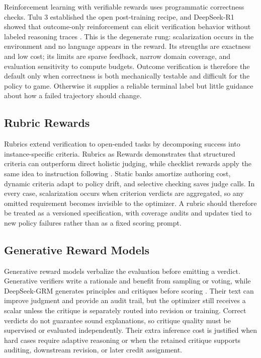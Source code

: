 Reinforcement learning with verifiable rewards uses programmatic correctness checks. Tulu 3 established the open post-training recipe, and DeepSeek-R1 showed that outcome-only reinforcement can elicit verification behavior without labeled reasoning traces \citep{lambert2024tulu,guo2025deepseek}. This is the degenerate rung: scalarization occurs in the environment and no language appears in the reward. Its strengths are exactness and low cost; its limits are sparse feedback, narrow domain coverage, and evaluation sensitivity to compute budgets.
Outcome verification is therefore the default only when correctness is both mechanically testable and difficult for the policy to game. Otherwise it supplies a reliable terminal label but little guidance about how a failed trajectory should change.

\subsection{Rubric Rewards}
\label{subsec:rubrics}

Rubrics extend verification to open-ended tasks by decomposing success into instance-specific criteria. Rubrics as Rewards demonstrates that structured criteria can outperform direct holistic judging, while checklist rewards apply the same idea to instruction following \citep{gunjal2025rubrics,viswanathan2025checklists}. Static banks amortize authoring cost, dynamic criteria adapt to policy drift, and selective checking saves judge calls. In every case, scalarization occurs when criterion verdicts are aggregated, so any omitted requirement becomes invisible to the optimizer.
A rubric should therefore be treated as a versioned specification, with coverage audits and updates tied to new policy failures rather than as a fixed scoring prompt.

\subsection{Generative Reward Models}
\label{subsec:genrm}

Generative reward models verbalize the evaluation before emitting a verdict. Generative verifiers write a rationale and benefit from sampling or voting, while DeepSeek-GRM generates principles and critiques before scoring \citep{zhang2025genrm,liu2025inferencetime}. Their text can improve judgment and provide an audit trail, but the optimizer still receives a scalar unless the critique is separately routed into revision or training. Correct verdicts do not guarantee sound explanations, so critique quality must be supervised or evaluated independently.
Their extra inference cost is justified when hard cases require adaptive reasoning or when the retained critique supports auditing, downstream revision, or later credit assignment.

